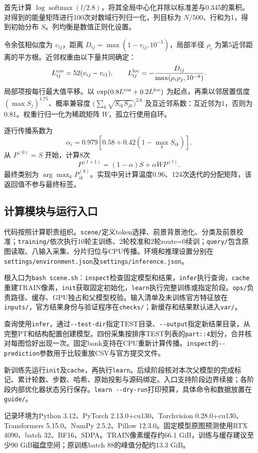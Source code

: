 \documentclass[UTF8,fontset=none,zihao=-4]{ctexart}
\newcommand{\sm}{\operatorname{softmax}}
\newcommand{\code}[1]{\nolinkurl{#1}}
\begin{document}
首先计算 $\log\sm(l/2.8)$，将其全局中心化并除以标准差与0.345的乘积。对得到的能量矩阵进行100次对数域行列归一化，列目标为 $N/500$、行和为1，得到初始分布 $S$。列均衡是数值正则化设置。

令余弦相似度为 $v_{ij}$，距离 $D_{ij}=\max(1-v_{ij},10^{-5})$，局部半径 $\rho_i$ 为第5近邻距离的平方根。近邻权重由以下量共同确定：
\[
L^{\rm cos}_{ij}=52(v_{ij}-v_{i1}),\qquad
L^{\rm loc}_{ij}=-\frac{D_{ij}}{\max(\rho_i\rho_j,10^{-8})}.
\]
局部项按每行最大值平移。以 $\exp(0.8L^{\rm cos}+0.2L^{\rm loc})$ 为起点，再乘以邻居置信度 $(\max S_j)^{1.75}$、概率兼容度 $\bigl(\sum_k\sqrt{S_{ik}S_{jk}}\bigr)^{2.6}$ 及互近邻系数：互近邻为1，否则为0.81。权重行归一化为稀疏矩阵 $W$，孤立行使用自环。

逐行传播系数为
\[
\alpha_i=0.979\left[0.58+0.42(1-\max_k S_{ik})\right].
\]
从 $P^{(0)}=S$ 开始，计算8次
\[
P^{(t+1)}=(1-\alpha)S+\alpha WP^{(t)}.
\]
最终类别为 $\arg\max_k P^{(8)}_{ik}$。实现中另计算温度0.96、124次迭代的分配矩阵，该返回值不参与最终标签。


\subsection*{计算模块与运行入口}
代码按照计算职责组织。\code{scene/}定义token选择、前景背景池化、分类及前景校准；\code{training/}依次执行10轮主训练、2轮校准和2轮route=0续训；\code{query/}包含原图读取、八输入采集、分片归位与CPU传播。环境和推理设置分别在\code{settings/environment.json}及\code{settings/inference.json}。

根入口为\code{bash scene.sh}：\code{inspect}检查固定模型和结果，\code{infer}执行查询，\code{cache}重建TRAIN像素，\code{init}获取固定初始化，\code{learn}执行完整训练或指定阶段。\code{ops/}负责路径、缓存、GPU独占和父模型校验。输入清单及未训练官方特征放在\code{inputs/}，官方结果身份与验证程序在\code{checks/}；新缓存和结果默认进入\code{var/}。

查询使用\code{infer}，通过\code{--test-dir}指定TEST目录、\code{--output}指定新结果目录，从完整PT和结构配置创建模型。四份采集按排序TEST列表的\code{part::4}划分，合并核对每图恰好出现一次。固定bank支持在CPU重新计算传播。\code{inspect}的\code{--prediction}参数用于比较重放CSV与官方提交文件。

新训练先运行\code{init}及\code{cache}，再执行\code{learn}。后续阶段核对本次父模型的完成标记、累计轮数、步数、哈希、原始投影与源码绑定。入口支持阶段边界续接；各阶段内部优化器状态另行保存。\code{learn --dry-run}打印预算，具体命令和数据放置在\code{guide/}。

记录环境为Python 3.12、PyTorch 2.13.0+cu130、Torchvision 0.28.0+cu130、Transformers 5.15.0、NumPy 2.5.2、Pillow 12.3.0。固定模型原图预测使用RTX 4090、batch 32、BF16、SDPA。TRAIN像素缓存约66.1 GiB，训练与缓存建议至少90 GiB磁盘空间；原训练batch 88的峰值分配约13.3 GiB。
\end{document}
